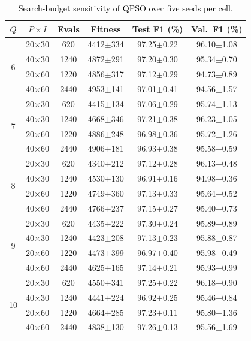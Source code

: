 \documentclass[conference]{IEEEtran}
\begin{document}
\begin{table}[!t]
\centering
\scriptsize
\caption{\textcolor{black}{Search-budget sensitivity of QPSO over five seeds per cell.}}
\label{tab:budget_sensitivity}
\setlength{\tabcolsep}{3pt}
\begin{tabular}{cccccc}
\hline\toprule
$Q$ & $P{\times}I$ & Evals & Fitness & Test F1 (\%) & Val.\ F1 (\%) \\
\hline\toprule
\multirow{4}{*}{6} & 20$\times$30 & 620 & 4412$\pm$334 & 97.25$\pm$0.22 & 96.10$\pm$1.08 \\
 & 40$\times$30 & 1240 & 4872$\pm$291 & 97.20$\pm$0.30 & 95.34$\pm$0.70 \\
 & 20$\times$60 & 1220 & 4856$\pm$317 & 97.12$\pm$0.29 & 94.73$\pm$0.89 \\
 & 40$\times$60 & 2440 & 4953$\pm$141 & 97.01$\pm$0.41 & 94.56$\pm$1.57 \\
\midrule
\multirow{4}{*}{7} & 20$\times$30 & 620 & 4415$\pm$134 & 97.06$\pm$0.29 & 95.74$\pm$1.13 \\
 & 40$\times$30 & 1240 & 4668$\pm$346 & 97.21$\pm$0.38 & 96.23$\pm$1.05 \\
 & 20$\times$60 & 1220 & 4886$\pm$248 & 96.98$\pm$0.36 & 95.72$\pm$1.26 \\
 & 40$\times$60 & 2440 & 4906$\pm$181 & 96.93$\pm$0.38 & 95.58$\pm$0.59 \\
\midrule
\multirow{4}{*}{8} & 20$\times$30 & 620 & 4340$\pm$212 & 97.12$\pm$0.28 & 96.13$\pm$0.48 \\
 & 40$\times$30 & 1240 & 4530$\pm$130 & 96.91$\pm$0.16 & 94.98$\pm$0.36 \\
 & 20$\times$60 & 1220 & 4749$\pm$360 & 97.13$\pm$0.33 & 95.64$\pm$0.52 \\
 & 40$\times$60 & 2440 & 4766$\pm$237 & 97.15$\pm$0.27 & 95.40$\pm$0.73 \\
\midrule
\multirow{4}{*}{9} & 20$\times$30 & 620 & 4435$\pm$222 & 97.30$\pm$0.24 & 95.89$\pm$0.89 \\
 & 40$\times$30 & 1240 & 4423$\pm$208 & 97.13$\pm$0.23 & 95.88$\pm$0.87 \\
 & 20$\times$60 & 1220 & 4473$\pm$399 & 96.97$\pm$0.40 & 95.98$\pm$0.49 \\
 & 40$\times$60 & 2440 & 4625$\pm$165 & 97.14$\pm$0.21 & 95.93$\pm$0.99 \\
\midrule
\multirow{4}{*}{10} & 20$\times$30 & 620 & 4550$\pm$341 & 97.25$\pm$0.22 & 96.18$\pm$0.90 \\
 & 40$\times$30 & 1240 & 4441$\pm$224 & 96.92$\pm$0.25 & 95.46$\pm$0.84 \\
 & 20$\times$60 & 1220 & 4664$\pm$285 & 97.23$\pm$0.11 & 95.80$\pm$1.36 \\
 & 40$\times$60 & 2440 & 4838$\pm$130 & 97.26$\pm$0.13 & 95.56$\pm$1.69 \\
\hline\toprule
\end{tabular}
\end{table}
\end{document}
